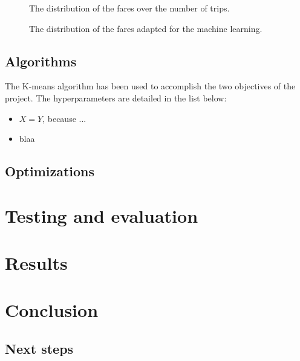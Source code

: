 ﻿\documentclass[a4paper]{article}
\begin{document}
\begin{figure}
  \centering
  \caption{The distribution of the fares over the number of trips.}
  \label{fig:distribution-fares-bad}
\end{figure}

\begin{figure}
  \centering
  \caption{The distribution of the fares adapted for the machine learning.}
  \label{fig:distribution-fares-fixed}
\end{figure}


\subsection{Algorithms}
The K-means algorithm has been used to accomplish the two objectives of the project. The hyperparameters are detailed in the list below:

\begin{itemize}
  \item $X=Y$, because ...
  \item blaa
\end{itemize}


\subsection{Optimizations}



\section{Testing and evaluation}

\section{Results}

\section{Conclusion}
\subsection{Next steps}
\end{document}
